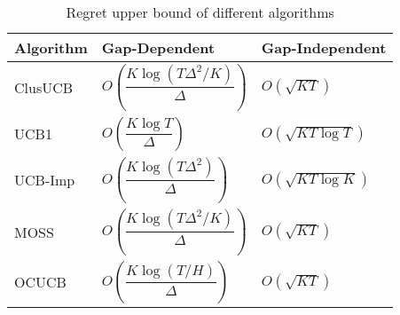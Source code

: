 \begin{table}[t]
\caption{Regret upper bound of different algorithms}
\label{tab:comp-bds}
\begin{center}
\begin{tabular}{p{6em}p{12em}p{10em}}
\toprule
Algorithm  & Gap-Dependent & Gap-Independent \\
\hline
ClusUCB		& $O\left( \dfrac{K\log (T\Delta^2 /K)}{\Delta}\right)$ & $O\left(\sqrt{KT}\right)$\\
UCB1        & $O\left( \dfrac{K\log T}{\Delta} \right)$ & $O\left(\sqrt{KT\log T}\right)$ \\%
UCB-Imp 		& $O\left( \dfrac{K\log (T\Delta^2)}{\Delta} \right)$ & $O\left(\sqrt{KT\log K}\right)$ \\%
MOSS	     	& $O\left( \dfrac{K\log (T\Delta^2 /K)}{\Delta}\right)$ & $O\left(\sqrt{KT}\right)$\\%
OCUCB     	& $O\left( \dfrac{K\log (T/ H)}{\Delta}\right)$ & $O\left(\sqrt{KT}\right)$\\\midrule
\end{tabular}
\end{center}
\vspace*{-2em}
\end{table}



